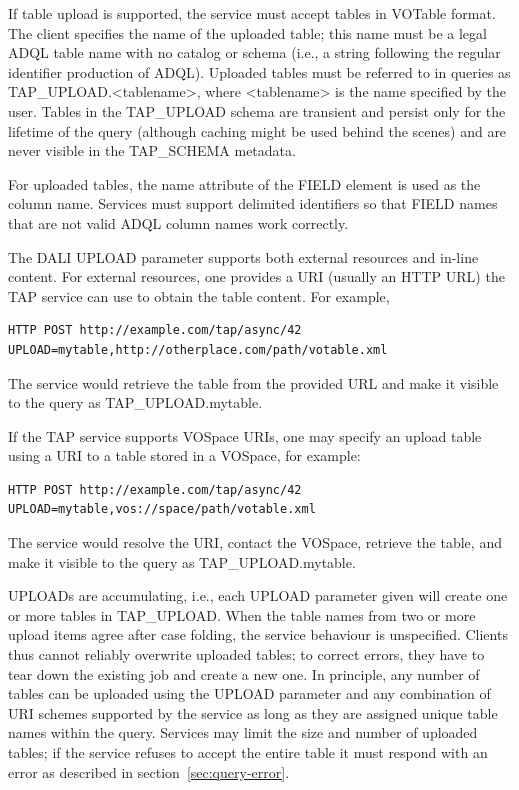 \documentclass[11pt,letter]{ivoa}
\newcommand{\tapschema}{TAP\_SCHE\-MA}
\newcommand{\tapupload}{TAP\_UPLOAD}
\newcommand{\tapschema}{\mbox{%
  \relsize{-0.5}TAP\discretionary{-}{}{\kern-2pt\_}SCHEMA}}
\newcommand{\tapupload}{%
  {\relsize{-0.5}TAP\discretionary{-}{}{\kern-2pt\_}UPLOAD}}
\begin{document}
If table upload is supported, the service must accept tables in VOTable format. 
The client specifies the name of the uploaded table; this name must be a legal 
ADQL table name with no catalog or schema (i.e., a string following the 
regular identifier production of ADQL). Uploaded tables must be 
referred 
to in queries as \tapupload.<tablename>, where <tablename> is the name
specified by the user. Tables in the \tapupload{} schema are 
transient and persist only for the lifetime of the query (although caching might 
be used behind the scenes) and are never visible in the 
\tapschema{} metadata.

For uploaded tables, the name attribute of the FIELD element is used as the column 
name. Services must support delimited identifiers so that 
FIELD names that are not valid ADQL column names work correctly.

The DALI UPLOAD parameter supports both external resources and 
in-line 
content. For external resources, one provides a URI (usually an HTTP URL) the 
TAP service can use to obtain the table content. For example,
\begin{verbatim}
HTTP POST http://example.com/tap/async/42
UPLOAD=mytable,http://otherplace.com/path/votable.xml
\end{verbatim}
The service would retrieve the table from the provided URL and 
make it visible to the query as \tapupload.mytable.

If the TAP service supports VOSpace URIs, one may 
specify an upload table using a URI to a table stored in a VOSpace, for example:
\begin{verbatim}
HTTP POST http://example.com/tap/async/42
UPLOAD=mytable,vos://space/path/votable.xml
\end{verbatim}
The service would resolve the URI, contact the VOSpace, retrieve the table, and 
make it visible to the query as \tapupload.mytable.

UPLOADs are accumulating, i.e., each UPLOAD parameter given will create one or 
more tables in \tapupload. When the table names from two or more 
upload items agree after case folding, the service behaviour is unspecified. 
Clients thus cannot reliably overwrite uploaded tables; to correct errors, they 
have to tear down the existing job and create a new one. In principle, any 
number of tables can be uploaded using the UPLOAD parameter and any combination 
of URI schemes supported by the service as long as they are assigned unique 
table names within the query. Services may limit the size and number of 
uploaded tables; if the service refuses to accept the entire table it must 
respond with an error as described in section~\ref{sec:query-error}.
\end{document}
